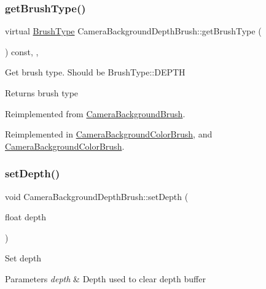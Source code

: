 \subsubsection{\texorpdfstring{get\+Brush\+Type()}{getBrushType()}\hspace{0.1cm}{\footnotesize\ttfamily [2/2]}}
{\footnotesize\ttfamily virtual \hyperlink{classCameraBackgroundBrush_acb83e8d05e7ab9386c041d22c444760f}{Brush\+Type} Camera\+Background\+Depth\+Brush\+::get\+Brush\+Type (\begin{DoxyParamCaption}{ }\end{DoxyParamCaption}) const\hspace{0.3cm}{\ttfamily [inline]}, {\ttfamily [override]}, {\ttfamily [virtual]}}

Get brush type. Should be Brush\+Type\+::\+D\+E\+P\+TH \begin{DoxyReturn}{Returns}
brush type 
\end{DoxyReturn}


Reimplemented from \hyperlink{classCameraBackgroundBrush_a72447fd86e40e0d7e263b906c2f9af12}{Camera\+Background\+Brush}.



Reimplemented in \hyperlink{classCameraBackgroundColorBrush_a96ecf77baa742b668db0d22c350b8f1b}{Camera\+Background\+Color\+Brush}, and \hyperlink{classCameraBackgroundColorBrush_a96ecf77baa742b668db0d22c350b8f1b}{Camera\+Background\+Color\+Brush}.

\mbox{\label{classCameraBackgroundDepthBrush_af2ad2cf604a43238be0b639e2b5a4079}} 
\subsubsection{\texorpdfstring{set\+Depth()}{setDepth()}\hspace{0.1cm}{\footnotesize\ttfamily [1/2]}}
{\footnotesize\ttfamily void Camera\+Background\+Depth\+Brush\+::set\+Depth (\begin{DoxyParamCaption}\item[{float}]{depth }\end{DoxyParamCaption})\hspace{0.3cm}{\ttfamily [inline]}}

Set depth 
\begin{DoxyParams}{Parameters}
{\em depth} & Depth used to clear depth buffer \\
\hline
\end{DoxyParams}
\mbox{\label{classCameraBackgroundDepthBrush_af2ad2cf604a43238be0b639e2b5a4079}} 
